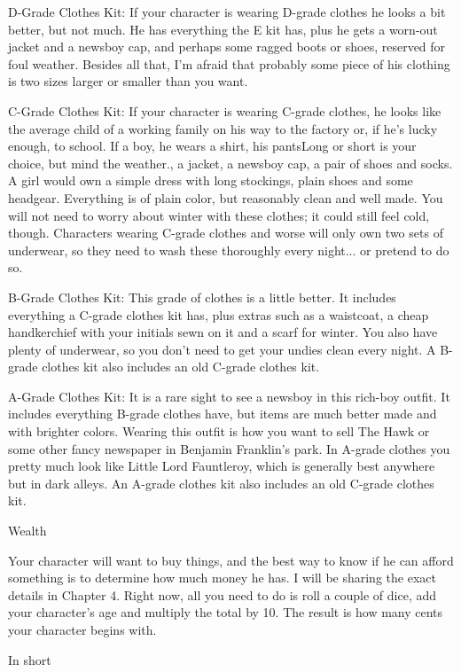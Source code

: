 D-Grade Clothes Kit: If your character is wearing D-grade clothes he looks a bit better, but not much. He has everything the E kit has, plus he gets a worn-out jacket and a newsboy cap, and perhaps some ragged boots or shoes, reserved for foul weather. Besides all that, I'm afraid that probably some piece of his clothing is two sizes larger or smaller than you want.

C-Grade Clothes Kit: If your character is wearing C-grade clothes, he looks like the average child of a working family on his way to the factory or, if he's lucky enough, to school. If a boy, he wears a shirt, his pantsLong or short is your choice, but mind the weather., a jacket, a newsboy cap, a pair of shoes and socks. A girl would own a simple dress with long stockings, plain shoes and some headgear. Everything is of plain color, but reasonably clean and well made. You will not need to worry about winter with these clothes; it could still feel cold, though. Characters wearing C-grade clothes and worse will only own two sets of underwear, so they need to wash these thoroughly every night... or pretend to do so.

B-Grade Clothes Kit: This grade of clothes is a little better. It includes everything a C-grade clothes kit has, plus extras such as a waistcoat, a cheap handkerchief with your initials sewn on it and a scarf for winter. You also have plenty of underwear, so you don't need to get your undies clean every night. A B-grade clothes kit also includes an old C-grade clothes kit.

A-Grade Clothes Kit: It is a rare sight to see a newsboy in this rich-boy outfit. It includes everything B-grade clothes have, but items are much better made and with brighter colors. Wearing this outfit is how you want to sell The Hawk or some other fancy newspaper in Benjamin Franklin's park. In A-grade clothes you pretty much look like Little Lord Fauntleroy, which is generally best anywhere but in dark alleys. An A-grade clothes kit also includes an old C-grade clothes kit.

Wealth

Your character will want to buy things, and the best way to know if he can afford something is to determine how much money he has. I will be sharing the exact details in Chapter 4. Right now, all you need to do is roll a couple of dice, add your character's age and multiply the total by 10. The result is how many cents your character begins with.

In short

